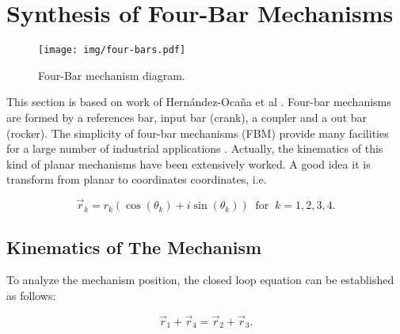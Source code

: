\documentclass[12pt,letterpape]{article}
\begin{document}
\section{Synthesis of Four-Bar Mechanisms} %
\label{sec:synthesis_of_four_bar_mechanisms}

\begin{figure}[!ht]
	\centering
	\texttt{[image: img/four-bars.pdf]}
	\caption{Four-Bar mechanism diagram.}
	\label{fig:fourbar}
\end{figure}

This section is based on work of Hern{\'a}ndez-Oca{\~n}a et al \cite{hernandez2016}.
Four-bar mechanisms are formed by a references bar, input bar (crank), a coupler
and a out bar (rocker). The simplicity of four-bar mechanisms (FBM) provide many facilities
for a large number of industrial applications \cite{david2005, mccarthy6, toussaint3}.
Actually, the kinematics of this kind of planar mechanisms have been extensively
worked. A good idea it is transform from planar to coordinates coordinates, i.e.

\begin{equation}
	\vec{r}_k = r_k ( \cos(\theta_k) + i \sin( \theta_k ) ) \ \text{ for } \ k = 1,2,3,4.
	\label{eqn:rpolar}
\end{equation}

\subsection{Kinematics of The Mechanism} %
\label{sub:kinematics_of_the_mechanism}

To analyze the mechanism position, the closed loop equation can be established as follows:

\begin{equation}
	\vec{r}_1 + \vec{r}_4 = \vec{r}_2 + \vec{r}_3.
	\label{eqn:sumsr}
\end{equation}
\end{document}
